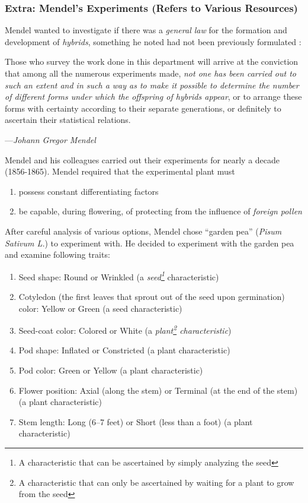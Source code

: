 \subsubsection{Extra: Mendel's Experiments (Refers to Various Resources)}
Mendel wanted to investigate if there was a \emph{general law} for the formation and development of \emph{hybrids}, something he noted had not been previously formulated \cite{mendel-fisher}: 
\epigraph{
    Those who survey the work done in this department will arrive at the conviction that among all the numerous experiments made, \emph{not one has been carried out to such an extent and in such a way as to make it possible to determine the number of different forms under which the offspring of hybrids appear}, or to arrange these forms with certainty according to their separate generations, or definitely to ascertain their statistical relations.
}
{
    ---\textit{Johann Gregor Mendel \cite{mendel-fisher}}
}

Mendel and his colleagues carried out their experiments for nearly a decade (1856-1865). Mendel required \cite{mendel-fisher} that the experimental plant must
\begin{enumerate}
    \item possess constant differentiating factors
    \item be capable, during flowering, of protecting from the influence of \emph{foreign pollen}
\end{enumerate}

After careful analysis of various options, Mendel chose ``garden pea'' (\emph{Pisum Sativum L.}) to experiment with. He decided to experiment with the garden pea and examine following traits:
\begin{enumerate}
    \item Seed shape: Round or Wrinkled (a \emph{seed\footnote{A characteristic that can be ascertained by simply analyzing the seed}} characteristic)
    \item Cotyledon (the first leaves that sprout out of the seed upon germination) color: Yellow or Green (a seed characteristic)
    \item Seed-coat color: Colored or White (a \emph{plant\footnote{A characteristic that can only be ascertained by waiting for a plant to grow from the seed} characteristic})
    \item Pod shape: Inflated or Constricted (a plant characteristic)
    \item Pod color: Green or Yellow (a plant characteristic)
    \item Flower position: Axial (along the stem) or Terminal (at the end of the stem) (a plant characteristic)
    \item Stem length: Long (6--7 feet) or Short (less than a foot) (a plant characteristic)
\end{enumerate}

